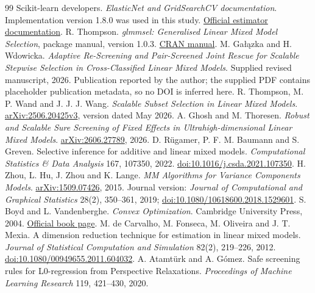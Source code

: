 \documentclass[11pt,a4paper]{article}
\theoremstyle{remark}\newtheorem{remark}[theorem]{Remark}
\begin{document}
\clearpage
\begin{thebibliography}{99}\small
{} Scikit-learn developers.
\emph{ElasticNet and GridSearchCV documentation}. Implementation version 1.8.0
was used in this study.
\href{https://scikit-learn.org/stable/modules/generated/sklearn.linear_model.ElasticNet.html}{Official estimator documentation}.
 R. Thompson. \emph{glmmsel: Generalised Linear Mixed
Model Selection}, package manual, version 1.0.3.
\href{https://cran.r-project.org/web/packages/glmmsel/glmmsel.pdf}{CRAN manual}.
 M. Ga\l{}\k{a}zka and H. Wdowicka.
\emph{Adaptive Re-Screening and Pair-Screened Joint Rescue for Scalable Stepwise
Selection in Cross-Classified Linear Mixed Models}. Supplied revised manuscript,
2026. Publication reported by the author; the supplied PDF contains placeholder
publication metadata, so no DOI is inferred here.
 R. Thompson, M. P. Wand and J. J. J. Wang.
\emph{Scalable Subset Selection in Linear Mixed Models}.
\href{https://arxiv.org/html/2506.20425v3}{arXiv:2506.20425v3}, version dated May 2026.
 A. Ghosh and M. Thoresen.
\emph{Robust and Scalable Sure Screening of Fixed Effects in Ultrahigh-dimensional
Linear Mixed Models}. \href{https://arxiv.org/abs/2606.27789}{arXiv:2606.27789}, 2026.
 D. R\"ugamer, P. F. M. Baumann and S. Greven.
Selective inference for additive and linear mixed models.
\emph{Computational Statistics \& Data Analysis} 167, 107350, 2022.
\href{https://doi.org/10.1016/j.csda.2021.107350}{doi:10.1016/j.csda.2021.107350}.
 H. Zhou, L. Hu, J. Zhou and K. Lange.
\emph{MM Algorithms for Variance Components Models}.
\href{https://arxiv.org/abs/1509.07426}{arXiv:1509.07426}, 2015.
Journal version: \emph{Journal of Computational and Graphical Statistics}
28(2), 350--361, 2019; \href{https://doi.org/10.1080/10618600.2018.1529601}{doi:10.1080/10618600.2018.1529601}.
 S. Boyd and L. Vandenberghe.
\emph{Convex Optimization}. Cambridge University Press, 2004.
\href{https://web.stanford.edu/~boyd/cvxbook/}{Official book page}.
 M. de Carvalho, M. Fonseca, M. Oliveira and J. T. Mexia.
A dimension reduction technique for estimation in linear mixed models.
\emph{Journal of Statistical Computation and Simulation} 82(2), 219--226, 2012.
\href{https://doi.org/10.1080/00949655.2011.604032}{doi:10.1080/00949655.2011.604032}.
 A. Atamt\"urk and A. G\'omez.
Safe screening rules for L0-regression from Perspective Relaxations.
\emph{Proceedings of Machine Learning Research} 119, 421--430, 2020.

\end{thebibliography}
\end{document}
